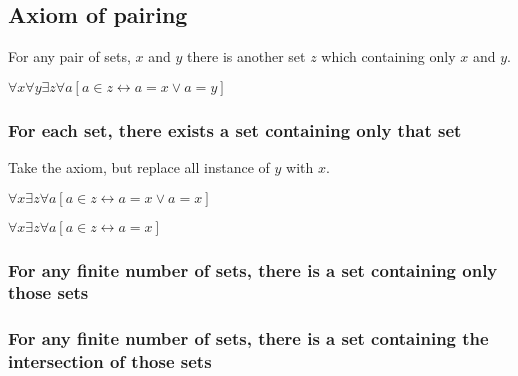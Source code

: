 
\subsection{Axiom of pairing}

For any pair of sets, \(x\) and \(y\) there is another set \(z\) which containing only \(x\) and \(y\).

\(\forall x \forall y \exists z \forall a[a\in z \leftrightarrow a=x \lor a=y]\)

\subsubsection{For each set, there exists a set containing only that set}

Take the axiom, but replace all instance of \(y\) with \(x\).

\(\forall x \exists z \forall a[a\in z \leftrightarrow a=x \lor a=x]\)

\(\forall x \exists z \forall a[a\in z \leftrightarrow a=x]\)

\subsubsection{For any finite number of sets, there is a set containing only those sets}

\subsubsection{For any finite number of sets, there is a set containing the intersection of those sets}

